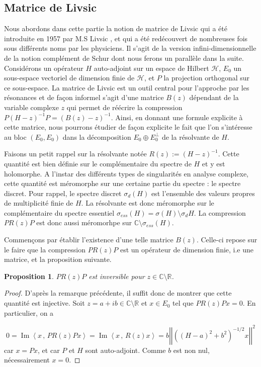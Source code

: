 \documentclass[12pt,openany,a4paper, titlepage]{article}
\newcommand{\lp}{\left(}
\newcommand{\rp}{\right)}
\newcommand{\lb}{\left|}
\newcommand{\rb}{\right|}
\newcommand{\la}{\left\langle}
\newcommand{\ra}{\right\rangle}
\newcommand{\R}{\mathbb{R}}
\newcommand{\C}{\mathbb{C}}
\newcommand{\HH}{\mathcal{H}}
\newcommand{\inv}{^{-1}}
\newcommand{\im}{\operatorname{Im}}
\newtheorem{prop}{Proposition}
\theoremstyle{definition}
\theoremstyle{definition}
\theoremstyle{definition}
\theoremstyle{definition}
\theoremstyle{definition}
\theoremstyle{definition}
\begin{document}
\subsection{Matrice de Livsic}

Nous abordons dans cette partie la notion de matrice de Livsic qui a été introduite en 1957 par M.S Livsic \cite{HOWLAND1975415}, et qui a été redécouvert de nombreuses fois sous différents noms par les physiciens. Il s'agit de la version infini-dimensionnelle de la notion complément de Schur dont nous ferons un parallèle dans la suite. Considérons un opérateur $H$ auto-adjoint sur un espace de Hilbert $\HH$, $E_0$ un sous-espace vectoriel de dimension finie de $\HH$, et $P$ la projection orthogonal sur ce sous-espace. La matrice de Livsic est un outil central pour l'approche par les résonances et de façon informel s'agit d'une matrice $B(z)$ dépendant de la variable complexe $z$ qui permet de réécrire la compression $P(H-z)\inv P = (B(z) -z)\inv$. Ainsi, en donnant une formule explicite à cette matrice, nous pourrons étudier de façon explicite le fait que l'on s'intéresse au bloc $(E_0,E_0)$ dans la décomposition $E_0\oplus E_0^\perp$ de la résolvante de $H$.

Faisons un petit rappel sur la résolvante notée $R(z) := (H-z)\inv$. Cette quantité est bien définie sur le complémentaire du spectre de $H$ et y est holomorphe. A l'instar des différents types de singularités en analyse complexe, cette quantité est méromorphe sur une certaine partie du spectre : le spectre discret. Pour rappel, le spectre discret $\sigma_d(H)$ est l'ensemble des valeurs propres de multiplicité finie de $H$. La résolvante est donc méromorphe sur le complémentaire du spectre essentiel $\sigma_{ess}(H) = \sigma(H)\setminus\sigma_d H$. La compression $PR(z)P$ est donc aussi méromorhpe sur  $\C\setminus\sigma_{ess}(H)$.

Commençons par établir l'existence d'une telle matrice $B(z)$. Celle-ci repose sur le faire que la compression $PR(z)P$ est un opérateur de dimension finie, i.e une matrice, et la proposition suivante.

\begin{prop}
    $PR(z)P$ est inversible pour $z\in\C\setminus\R$.
\end{prop}
\begin{proof}
    D'après la remarque précédente, il suffit donc de montrer que cette quantité est injective. Soit $z = a+ib\in\C\setminus\R$ et $x\in E_0$ tel que $PR(z)Px = 0$. En particulier, on a 

    $$0 = \im\la x\,,\, PR(z)Px \ra = \im\la x\,,\, R(z)x \ra = b\lb\lb\lp (H-a)^2 + b^2 \rp^{-1/2}x\rb\rb^2$$
    car $x = Px$, et car $P$ et $H$ sont auto-adjoint. Comme $b$ est non nul, nécessairement $x = 0$.
\end{proof}
\end{document}
